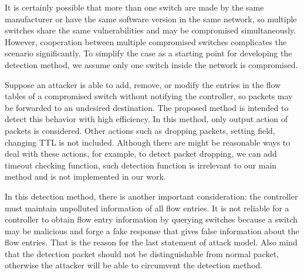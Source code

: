 It is certainly possible that more than one switch are made by the same manufacturer or have the same software version in the same network, so multiple switches share the same vulnerabilities and may be compromised simultaneously. However, cooperation between multiple compromised switches complicates the scenario significantly. To simplify the case as a starting point for developing the detection method, we assume only one switch inside the network is compromised.

Suppose an attacker is able to add, remove, or modify the entries in the flow tables of a compromised
switch without notifying the controller, so packets may be forwarded to an undesired destination. The proposed method is intended to detect this behavior with high efficiency. In this method, only output action of packets is considered. Other actions such as dropping packets, setting field, changing TTL is not included. Although there are might be reasonable ways to deal with these actions, for example, to detect packet dropping, we can add timeout checking function, such detection function is irrelevant to our main method and is not implemented in our work.

In this detection method, there is another important consideration: the controller must maintain unpolluted information of all flow entries. It is not reliable for a controller to obtain flow entry information by querying switches because a switch may be malicious and forge a fake response that gives false information about the flow entries. That is the reason for the last statement of attack model. Also mind that the detection packet should not be distinguishable from normal packet, otherwise the attacker will be able to circumvent the detection method. 